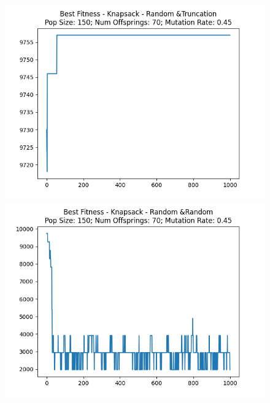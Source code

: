\documentclass[12pt]{report}
\theoremstyle{mytheoremstyle}
\theoremstyle{mytheoremstyle}
\theoremstyle{myproblemstyle}
\begin{document}
\begin{figure}[!]
\begin{minipage}{0.4\textwidth}
		\includegraphics[width=\linewidth]{../Analysis/BSF_Knapsack_4_3_150_70.png}
	\end{minipage}
	\hspace{\fill}
	\begin{minipage}{0.4\textwidth}
		\includegraphics[width=\linewidth]{../Analysis/BSF_Knapsack_4_4_150_70.png}
	\end{minipage}
\end{figure}
\end{document}
